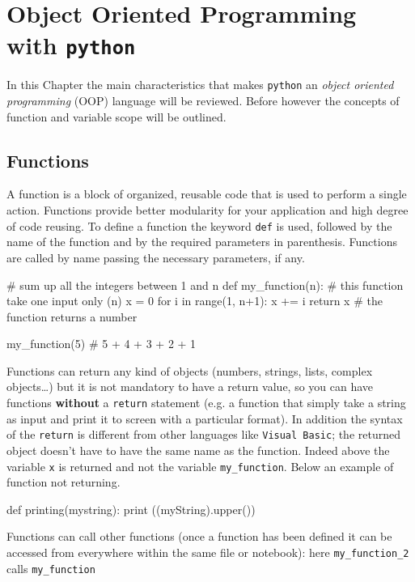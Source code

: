 \chapter{Object Oriented Programming with \texttt{python}}
\label{ch:oop}

In this Chapter the main characteristics that makes \texttt{python} an \textit{object oriented programming} (OOP) language will be reviewed. Before however the concepts of function and variable scope will be outlined.

\section{Functions}
\label{functions}

A function is a block of organized, reusable code that is used to perform a single action. Functions provide better modularity for your application and high degree of code reusing. To define a function the keyword \texttt{def} is used, followed by the name of the function and by the required parameters in parenthesis. Functions are called by name passing the necessary parameters, if any.

\begin{ipython}
# sum up all the integers between 1 and n
def my_function(n): # this function take one input only (n)
    x = 0
    for i in range(1, n+1):
        x += i
    return x # the function returns a number

my_function(5) # 5 + 4 + 3 + 2 + 1
\end{ipython}

Functions can return any kind of objects (numbers, strings, lists, complex objects\ldots) but it is not mandatory to have a return value, so you can have functions \textbf{without} a \texttt{return} statement (e.g. a function that simply take a string as input and print it to screen with a particular format).
In addition the syntax of the \texttt{return} is different from other languages like \texttt{Visual\ Basic}; the returned object doesn't have to have the same name as the function. Indeed above the variable \texttt{x} is returned and not the variable \texttt{my\_function}. Below an example of function not returning.

\begin{ipython}
def printing(mystring):
    print ((myString).upper())
\end{ipython}

Functions can call other functions (once a function has been defined it can be accessed from everywhere within the same file or notebook): here \texttt{my\_function\_2} calls \texttt{my\_function}


